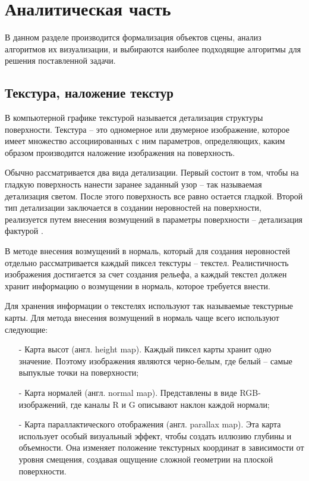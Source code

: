\chapter{Аналитическая часть}
В данном разделе производится формализация объектов сцены, анализ алгоритмов их визуализации, и выбираются наиболее подходящие алгоритмы для решения поставленной задачи.

\section{Текстура, наложение текстур}

В компьютерной графике текстурой называется детализация структуры поверхности. Текстура -- это одномерное или двумерное изображение, которое имеет множество ассоциированных с ним параметров, определяющих, каким образом производится наложение изображения на поверхность.

Обычно рассматривается два вида детализации. Первый состоит в том, чтобы на гладкую поверхность нанести заранее заданный узор -- так называемая детализация светом. После этого поверхность все равно остается гладкой. Второй тип детализации заключается в создании неровностей на поверхности, реализуется путем внесения возмущений в параметры поверхности -- детализация фактурой \cite{b1}.

В методе внесения возмущений в нормаль, который для создания неровностей отдельно рассматривается каждый пиксел текстуры -- текстел. Реалистичность изображения достигается за счет создания рельефа, а каждый текстел должен хранит информацию о возмущении в нормаль, которое требуется внести.

Для хранения информации о текстелях используют так называемые текстурные карты. Для метода внесения возмущений в нормаль чаще всего используют следующие:
\begin{itemize}[label=\arabic*)]
	\item[-] Карта высот (англ. height map). Каждый пиксел карты хранит одно значение. Поэтому изображения являются черно-белым, где белый – самые выпуклые точки на поверхности;
	\item[-] Карта нормалей (англ. normal map). Представлены в виде RGB-изображений, где каналы R и G описывают наклон каждой нормали;
	\item[-] Карта параллактического отображения (англ. parallax map). Эта карта использует особый визуальный эффект, чтобы создать иллюзию глубины и объемности. Она изменяет положение текстурных координат в зависимости от уровня смещения, создавая ощущение сложной геометрии на плоской поверхности.
\end{itemize}

